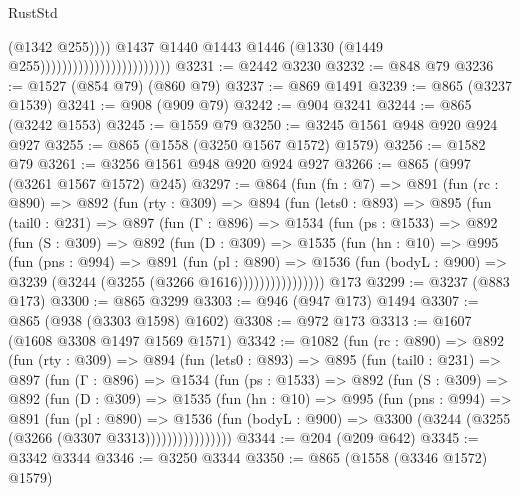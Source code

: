 \begin{lexlean}{RustStd}
\begin{coremodule}
                                                      (@1342 @255))))
                                                @1437
                                                @1440
                                                @1443
                                                @1446
                                                (@1330 (@1449 @255))))))))))))))))))))))))
@3231 := @2442 @3230
@3232 := @848 @79
@3236 := @1527 (@854 @79) (@860 @79)
@3237 := @869 @1491
@3239 := @865 (@3237 @1539)
@3241 := @908 (@909 @79)
@3242 := @904 @3241
@3244 := @865 (@3242 @1553)
@3245 := @1559 @79
@3250 := @3245 @1561 @948 @920 @924 @927
@3255 := @865 (@1558 (@3250 @1567 @1572) @1579)
@3256 := @1582 @79
@3261 := @3256 @1561 @948 @920 @924 @927
@3266 := @865 (@997 (@3261 @1567 @1572) @245)
@3297 := @864
    (fun (fn : @7) =>
    @891
      (fun (rc : @890) =>
      @892
        (fun (rty : @309) =>
        @894
          (fun (lets0 : @893) =>
          @895
            (fun (tail0 : @231) =>
            @897
              (fun (Γ : @896) =>
              @1534
                (fun (ps : @1533) =>
                @892
                  (fun (S : @309) =>
                  @892
                    (fun (D : @309) =>
                    @1535
                      (fun (hn : @10) =>
                      @995
                        (fun (pns : @994) =>
                        @891
                          (fun (pl : @890) =>
                          @1536
                            (fun (bodyL : @900) => @3239 (@3244 (@3255 (@3266 @1616))))))))))))))))
    @173
@3299 := @3237 (@883 @173)
@3300 := @865 @3299
@3303 := @946 (@947 @173) @1494
@3307 := @865 (@938 (@3303 @1598) @1602)
@3308 := @972 @173
@3313 := @1607 (@1608 @3308 @1497 @1569 @1571)
@3342 := @1082
    (fun (rc : @890) =>
    @892
      (fun (rty : @309) =>
      @894
        (fun (lets0 : @893) =>
        @895
          (fun (tail0 : @231) =>
          @897
            (fun (Γ : @896) =>
            @1534
              (fun (ps : @1533) =>
              @892
                (fun (S : @309) =>
                @892
                  (fun (D : @309) =>
                  @1535
                    (fun (hn : @10) =>
                    @995
                      (fun (pns : @994) =>
                      @891
                        (fun (pl : @890) =>
                        @1536
                          (fun (bodyL : @900) =>
                          @3300 (@3244 (@3255 (@3266 (@3307 @3313))))))))))))))))
@3344 := @204 (@209 @642)
@3345 := @3342 @3344
@3346 := @3250 @3344
@3350 := @865 (@1558 (@3346 @1572) @1579)

\end{coremodule}
\end{lexlean}
